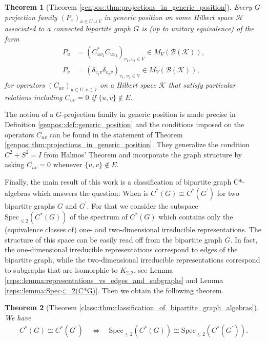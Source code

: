 \documentclass[a4paper]{amsart}
\newtheorem{introthm}{Theorem}
\begin{document}
\begin{introthm}[Theorem \ref{genpos::thm:projections_in_generic_position}]
  Every $G$-projection family $(P_x)_{x \in U \cup V}$ in generic position on some Hilbert space $\mathcal{H}$ associated to a connected bipartite graph $G$ is (up to unitary equivalence) of the form
  \begin{align*}
    P_u &= (C_{u v_1}^\ast C_{u v_2})_{v_1, v_2 \in V} \in M_{V}(\mathcal{B}(\mathcal{K})), \\
    P_v &= (\delta_{v_1 v} \delta_{v_2 v})_{v_1, v_2 \in V} \in M_{V}(\mathcal{B}(\mathcal{K})),
  \end{align*}
  for operators $(C_{uv})_{u \in U, v \in V}$ on a Hilbert space $\mathcal{K}$ that satisfy particular relations including $C_{uv} = 0$ if $\{u,v \} \not \in E$.
\end{introthm}

The notion of a $G$-projection family in generic position is made precise in Definition \ref{genpos::def::generic_position} and the conditions imposed on the operators $C_{uv}$ can be found in the statement of Theorem \ref{genpos::thm:projections_in_generic_position}. They generalize the condition $C^2 + S^2 = I$ from Halmos' Theorem and incorporate the graph structure by asking $C_{uv} = 0$ whenever $\{u,v\} \not \in E$.

Finally, the main result of this work is a classification of bipartite graph C*-algebras which answers the question: When is $C^\ast(G) \cong C^\ast(G^\prime)$ for two bipartite graphs $G$ and $G^\prime$. For that we consider the subspace $\mathrm{Spec}_{\leq 2}(C^\ast(G))$ of the spectrum of $C^\ast(G)$ which contains only the (equivalence classes of) one- and two-dimensional irreducible representations.  The structure of this space can be easily read off from the bipartite graph $G$. In fact, the one-dimensional irreducible representations correspond to edges of the bipartite graph, while the two-dimensional irreducible representations correspond to subgraphs that are isomorphic to $K_{2,2}$, see Lemma \ref{reps::lemma:representations_vs_edges_and_subgraphs} and Lemma \ref{reps::lemma:Spec<=2(C*G)}. Then we obtain the following theorem.

\begin{introthm}[Theorem \ref{class::thm:classification_of_bipartite_graph_algebras}]
    \label{intro::thm:classification_of_bipartite_graph_algebras}
    We have 
    \begin{align*}
        C^\ast(G) \cong C^\ast(G^\prime) 
            \quad \Leftrightarrow \quad 
        \mathrm{Spec}_{\leq 2}(C^\ast(G)) \cong \mathrm{Spec}_{\leq 2}(C^\ast(G^\prime)).
    \end{align*}
\end{introthm}
\end{document}
